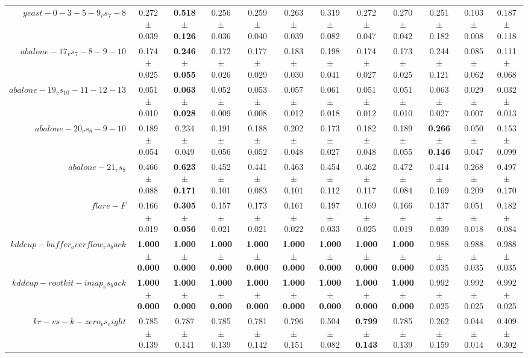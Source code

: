 \begin{table}[!ht]
{\begin{tabular}{r c c c c c c c c c c c}
$yeast-0-3-5-9_vs_7-8$ & 0.272 $\pm$ 0.039 & \textbf{0.518 $\pm$ 0.126} & 0.256 $\pm$ 0.036 & 0.259 $\pm$ 0.040 & 0.263 $\pm$ 0.039 & 0.319 $\pm$ 0.082 & 0.272 $\pm$ 0.047 & 0.270 $\pm$ 0.042 & 0.251 $\pm$ 0.182 & 0.103 $\pm$ 0.008 & 0.187 $\pm$ 0.118 \\
$abalone-17_vs_7-8-9-10$ & 0.174 $\pm$ 0.025 & \textbf{0.246 $\pm$ 0.055} & 0.172 $\pm$ 0.026 & 0.177 $\pm$ 0.029 & 0.183 $\pm$ 0.030 & 0.198 $\pm$ 0.041 & 0.174 $\pm$ 0.027 & 0.173 $\pm$ 0.025 & 0.244 $\pm$ 0.121 & 0.085 $\pm$ 0.062 & 0.111 $\pm$ 0.068 \\
$abalone-19_vs_10-11-12-13$ & 0.051 $\pm$ 0.010 & \textbf{0.063 $\pm$ 0.028} & 0.052 $\pm$ 0.009 & 0.053 $\pm$ 0.008 & 0.057 $\pm$ 0.012 & 0.061 $\pm$ 0.018 & 0.051 $\pm$ 0.012 & 0.051 $\pm$ 0.010 & 0.063 $\pm$ 0.027 & 0.029 $\pm$ 0.007 & 0.032 $\pm$ 0.013 \\
$abalone-20_vs_8-9-10$ & 0.189 $\pm$ 0.054 & 0.234 $\pm$ 0.049 & 0.191 $\pm$ 0.056 & 0.188 $\pm$ 0.052 & 0.202 $\pm$ 0.048 & 0.173 $\pm$ 0.027 & 0.182 $\pm$ 0.048 & 0.189 $\pm$ 0.055 & \textbf{0.266 $\pm$ 0.146} & 0.050 $\pm$ 0.047 & 0.153 $\pm$ 0.099 \\
$abalone-21_vs_8$ & 0.466 $\pm$ 0.088 & \textbf{0.623 $\pm$ 0.171} & 0.452 $\pm$ 0.101 & 0.441 $\pm$ 0.083 & 0.463 $\pm$ 0.101 & 0.454 $\pm$ 0.112 & 0.462 $\pm$ 0.117 & 0.472 $\pm$ 0.084 & 0.414 $\pm$ 0.169 & 0.268 $\pm$ 0.209 & 0.497 $\pm$ 0.170 \\
$flare-F$ & 0.166 $\pm$ 0.019 & \textbf{0.305 $\pm$ 0.056} & 0.157 $\pm$ 0.021 & 0.173 $\pm$ 0.021 & 0.161 $\pm$ 0.022 & 0.197 $\pm$ 0.033 & 0.169 $\pm$ 0.025 & 0.166 $\pm$ 0.019 & 0.137 $\pm$ 0.039 & 0.051 $\pm$ 0.018 & 0.182 $\pm$ 0.084 \\
$kddcup-buffer_overflow_vs_back$ & \textbf{1.000 $\pm$ 0.000} & \textbf{1.000 $\pm$ 0.000} & \textbf{1.000 $\pm$ 0.000} & \textbf{1.000 $\pm$ 0.000} & \textbf{1.000 $\pm$ 0.000} & \textbf{1.000 $\pm$ 0.000} & \textbf{1.000 $\pm$ 0.000} & \textbf{1.000 $\pm$ 0.000} & 0.988 $\pm$ 0.035 & 0.988 $\pm$ 0.035 & 0.988 $\pm$ 0.035 \\
$kddcup-rootkit-imap_vs_back$ & \textbf{1.000 $\pm$ 0.000} & \textbf{1.000 $\pm$ 0.000} & \textbf{1.000 $\pm$ 0.000} & \textbf{1.000 $\pm$ 0.000} & \textbf{1.000 $\pm$ 0.000} & \textbf{1.000 $\pm$ 0.000} & \textbf{1.000 $\pm$ 0.000} & \textbf{1.000 $\pm$ 0.000} & 0.992 $\pm$ 0.025 & 0.992 $\pm$ 0.025 & 0.992 $\pm$ 0.025 \\
$kr-vs-k-zero_vs_eight$ & 0.785 $\pm$ 0.139 & 0.787 $\pm$ 0.141 & 0.785 $\pm$ 0.139 & 0.781 $\pm$ 0.142 & 0.796 $\pm$ 0.151 & 0.504 $\pm$ 0.082 & \textbf{0.799 $\pm$ 0.143} & 0.785 $\pm$ 0.139 & 0.262 $\pm$ 0.159 & 0.044 $\pm$ 0.014 & 0.409 $\pm$ 0.302 \\

\end{tabular}}
\end{table}
